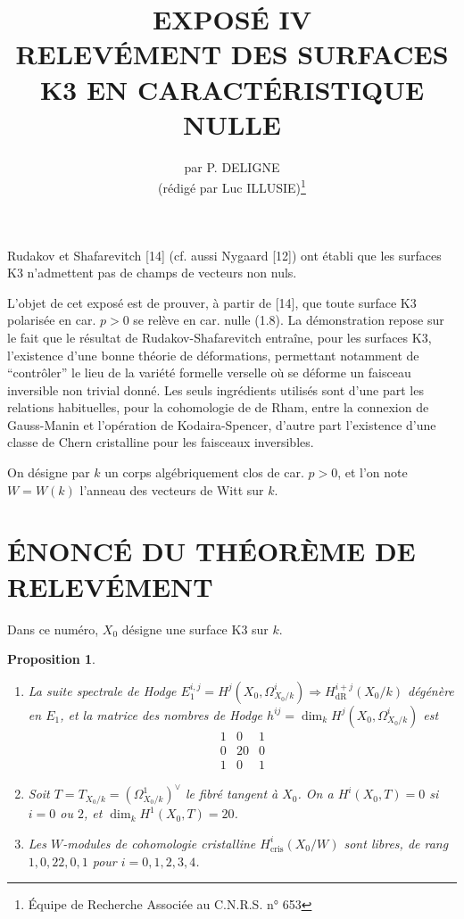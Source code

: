 \documentclass[12pt,a4paper]{article}
\title{\textbf{EXPOSÉ IV}\\[0.5em]
\textbf{RELEVÉMENT DES SURFACES K3 EN CARACTÉRISTIQUE NULLE}}
\author{par P. DELIGNE\\(rédigé par Luc ILLUSIE)\thanks{Équipe de Recherche Associée au C.N.R.S. n° 653}}
\date{}
\theoremstyle{plain}
\newtheorem{proposition}[theorem]{Proposition}
\theoremstyle{definition}
\theoremstyle{remark}
\newcommand{\cris}{\mathrm{cris}}
\begin{document}
\maketitle
\thispagestyle{empty}

Rudakov et Shafarevitch [14] (cf. aussi Nygaard [12]) ont établi que les surfaces K3 n'admettent pas de champs de vecteurs non nuls.

L'objet de cet exposé est de prouver, à partir de [14], que toute surface K3 polarisée en car. $p > 0$ se relève en car. nulle (1.8). La démonstration repose sur le fait que le résultat de Rudakov-Shafarevitch entraîne, pour les surfaces K3, l'existence d'une bonne théorie de déformations, permettant notamment de ``contrôler'' le lieu de la variété formelle verselle où se déforme un faisceau inversible non trivial donné. Les seuls ingrédients utilisés sont d'une part les relations habituelles, pour la cohomologie de de Rham, entre la connexion de Gauss-Manin et l'opération de Kodaira-Spencer, d'autre part l'existence d'une classe de Chern cristalline pour les faisceaux inversibles.

On désigne par $k$ un corps algébriquement clos de car. $p > 0$, et l'on note $W = W(k)$ l'anneau des vecteurs de Witt sur $k$.

\section{ÉNONCÉ DU THÉORÈME DE RELEVÉMENT}

Dans ce numéro, $X_0$ désigne une surface K3 sur $k$.

\begin{proposition}\label{prop:1.1}

\begin{enumerate}[label=\alph*)]
\item La suite spectrale de Hodge $E_1^{i,j} = H^j(X_0, \Omega_{X_0/k}^i) \Rightarrow H^{i+j}_{\mathrm{dR}}(X_0/k)$ dégénère en $E_1$, et la matrice des nombres de Hodge $h^{ij} = \dim_k H^j(X_0, \Omega_{X_0/k}^i)$ est
\[
\begin{matrix}
1 & 0 & 1 \\
0 & 20 & 0 \\
1 & 0 & 1
\end{matrix}
\]

\item Soit $T = T_{X_0/k} = (\Omega_{X_0/k}^1)^{\vee}$ le fibré tangent à $X_0$. On a $H^i(X_0, T) = 0$ si $i = 0$ ou $2$, et $\dim_k H^1(X_0, T) = 20$.

\item Les $W$-modules de cohomologie cristalline $H^i_{\cris}(X_0/W)$ sont libres, de rang $1, 0, 22, 0, 1$ pour $i = 0, 1, 2, 3, 4$.
\end{enumerate}
\end{proposition}
\end{document}
